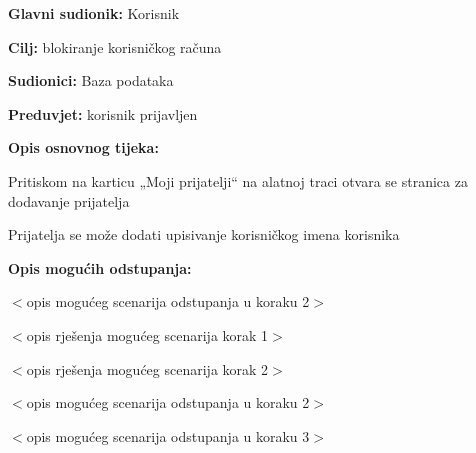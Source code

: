 	\noindent {}
\begin{packed_item}
	
	\item \textbf{Glavni sudionik: }Korisnik
	\item  \textbf{Cilj:} blokiranje korisničkog računa
	\item  \textbf{Sudionici:}
	Baza podataka
	\item  \textbf{Preduvjet:} korisnik prijavljen
	\item  \textbf{Opis osnovnog tijeka:}
	
	\item[] \begin{packed_enum}
		
		\item	Pritiskom na karticu „Moji prijatelji“ na alatnoj traci otvara se stranica za dodavanje prijatelja
		\item	Prijatelja se može dodati upisivanje korisničkog imena korisnika
		
	\end{packed_enum}
	
	\item  \textbf{Opis mogućih odstupanja:}
	
	\item[] \begin{packed_item}
		
		\item[2.a] $<$opis mogućeg scenarija odstupanja u koraku 2$>$
		\item[] \begin{packed_enum}
			
			\item $<$opis rješenja mogućeg scenarija korak 1$>$
			\item $<$opis rješenja mogućeg scenarija korak 2$>$
			
		\end{packed_enum}
		\item[2.b] $<$opis mogućeg scenarija odstupanja u koraku 2$>$
		\item[3.a] $<$opis mogućeg scenarija odstupanja  u koraku 3$>$
		
	\end{packed_item}
\end{packed_item}

